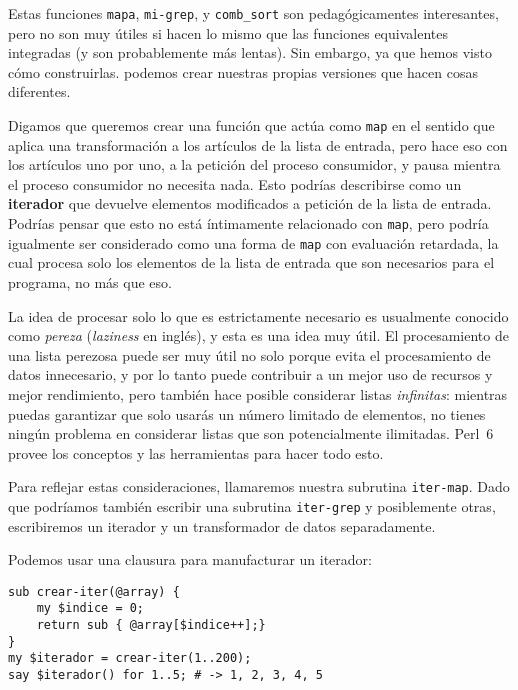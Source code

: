 Estas funciones {\tt mapa}, {\tt mi-grep}, y {\tt comb\_sort} son
pedagógicamentes interesantes, pero no son muy útiles si hacen lo mismo
que las funciones equivalentes integradas (y son probablemente más lentas).
Sin embargo, ya que hemos visto cómo construirlas. podemos crear nuestras
propias versiones que hacen cosas diferentes.

Digamos que queremos crear una función que actúa como {\tt map} en el 
sentido que aplica una transformación a los artículos de la lista de 
entrada, pero hace eso con los artículos uno por uno, a la petición del
proceso consumidor, y pausa mientra el proceso consumidor no necesita nada.
Esto podrías describirse como un {\bf iterador} que devuelve elementos 
modificados a petición de la lista de entrada. Podrías pensar que esto 
no está íntimamente relacionado con {\tt map}, pero podría igualmente ser 
considerado como una forma de {\tt map} con evaluación retardada, la cual
procesa solo los elementos de la lista de entrada que son necesarios para el
programa, no más que eso. 

La idea de procesar solo lo que es estrictamente necesario es usualmente 
conocido como \emph{pereza} (\emph{laziness} en inglés), y esta es una idea
muy útil. El procesamiento de una lista perezosa puede ser muy útil no solo 
porque evita el procesamiento de datos innecesario, y por lo tanto puede 
contribuir a un mejor uso de recursos y mejor rendimiento, pero también hace posible
considerar listas \emph{infinitas}: mientras puedas garantizar que solo usarás 
un número limitado de elementos, no tienes ningún problema en considerar listas
que son potencialmente ilimitadas. Perl~6 provee los conceptos y las herramientas
para hacer todo esto.

Para reflejar estas consideraciones, llamaremos nuestra subrutina {\tt iter-map}. 
Dado que podríamos también escribir una subrutina {\tt iter-grep} y posiblemente
otras, escribiremos un iterador y un transformador de datos separadamente.

Podemos usar una clausura para manufacturar un iterador:

\begin{verbatim}
sub crear-iter(@array) {
    my $indice = 0;
    return sub { @array[$indice++];}
}
my $iterador = crear-iter(1..200);
say $iterador() for 1..5; # -> 1, 2, 3, 4, 5
\end{verbatim} 

